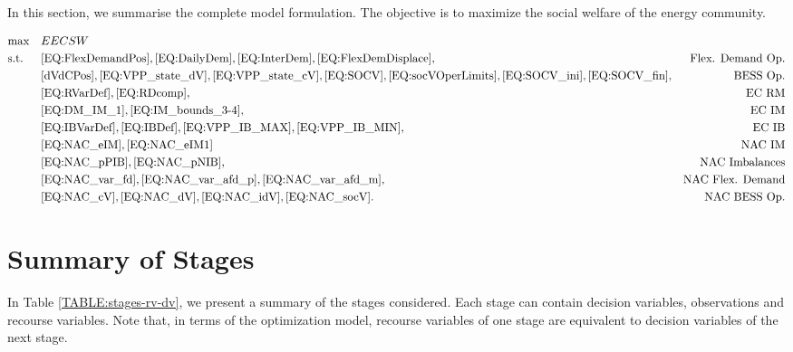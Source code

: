 \documentclass{article}
\begin{document}
In this section, we summarise the complete model formulation. The objective is to maximize the social welfare of the energy community.

\begin{align*}
\notag & \text{max} & & EECSW \\
\notag & \text{s.t.} & & \eqref{EQ:FlexDemandPos}, \eqref{EQ:DailyDem}, \eqref{EQ:InterDem}, \eqref{EQ:FlexDemDisplace},  & \text{Flex. Demand Op.} \\
\notag & & & \eqref{dVdCPos}, \eqref{EQ:VPP_state_dV}, \eqref{EQ:VPP_state_cV}, \eqref{EQ:SOCV}, \eqref{EQ:socVOperLimits}, \eqref{EQ:SOCV_ini}, \eqref{EQ:SOCV_fin}, & \text{BESS Op.} \\
\notag & & & \eqref{EQ:RVarDef}, \eqref{EQ:RDcomp},  & \text{EC RM} \\
\notag & & & \eqref{EQ:DM_IM_1}, \eqref{EQ:IM_bounds_3-4}, & \text{EC IM} \\
\notag & & & \eqref{EQ:IBVarDef}, \eqref{EQ:IBDef}, \eqref{EQ:VPP_IB_MAX}, \eqref{EQ:VPP_IB_MIN}, & \text{EC IB} \\
\notag & & & \eqref{EQ:NAC_eIM}, \eqref{EQ:NAC_eIM1} & \text{NAC IM} \\
\notag & & & \eqref{EQ:NAC_pPIB}, \eqref{EQ:NAC_pNIB}, & \text{NAC Imbalances} \\
\notag & & & \eqref{EQ:NAC_var_fd}, \eqref{EQ:NAC_var_afd_p}, \eqref{EQ:NAC_var_afd_m}, & \text{NAC Flex. Demand} \\
\notag & & & \eqref{EQ:NAC_cV}, \eqref{EQ:NAC_dV}, \eqref{EQ:NAC_idV}, \eqref{EQ:NAC_socV}. & \text{NAC BESS Op.} \\
\end{align*}

\section{Summary of Stages}

In Table \ref{TABLE:stages-rv-dv}, we present a summary of the stages considered. Each stage can contain decision variables, observations and recourse variables. Note that, in terms of the optimization model, recourse variables of one stage are equivalent to decision variables of the next stage.
\end{document}
